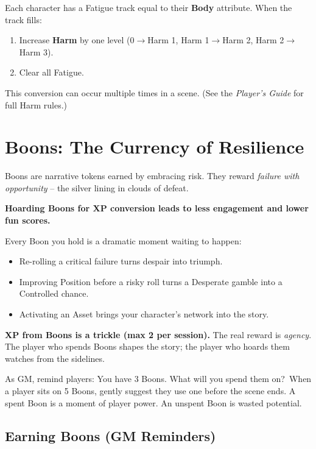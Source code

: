 Each character has a Fatigue track equal to their \textbf{Body} attribute. When the track fills:
\begin{enumerate}
  \item Increase \textbf{Harm} by one level (0$\rightarrow$Harm 1, Harm 1$\rightarrow$Harm 2, Harm 2$\rightarrow$Harm 3).
  \item Clear all Fatigue.
\end{enumerate}
This conversion can occur multiple times in a scene. (See the \textit{Player's Guide} for full Harm rules.)

\section{Boons: The Currency of Resilience}
\label{sec:boons-gm}

Boons are narrative tokens earned by embracing risk. They reward \textit{failure with opportunity} -- the silver lining in clouds of defeat.

\begin{tcolorbox}[colback=yellow!5!white, colframe=yellow!75!black, title={Why You Should Spend Boons -- The Math of Fun},breakable]
\textbf{Hoarding Boons for XP conversion leads to less engagement and lower fun scores.}

\medskip
\noindent Every Boon you hold is a dramatic moment waiting to happen:
\begin{itemize}
  \item Re-rolling a critical failure turns despair into triumph.
  \item Improving Position before a risky roll turns a Desperate gamble into a Controlled chance.
  \item Activating an Asset brings your character's network into the story.
\end{itemize}
\textbf{XP from Boons is a trickle (max 2 per session).} The real reward is \textit{agency}. The player who spends Boons shapes the story; the player who hoards them watches from the sidelines.

\medskip
\noindent As GM, remind players: \textquotedbl You have 3 Boons. What will you spend them on?\textquotedbl\ When a player sits on 5 Boons, gently suggest they use one before the scene ends. A spent Boon is a moment of player power. An unspent Boon is wasted potential.
\end{tcolorbox}

\subsection{Earning Boons (GM Reminders)}
\label{subsec:boons-earn}

